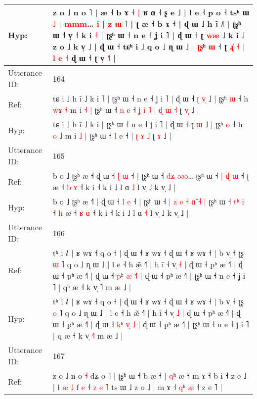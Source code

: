 \documentclass[10pt]{article}
\DeclareRobustCommand{\hl}[1]{{\textcolor{red}{#1}}}
\begin{document}
\begin{longtable}{ll}
 \\
Hyp: & z o ˩ n o ˥ |\hl{}\hl{} æ ˧ b ɤ ˧\hl{ }\hl{|} ʁ ɑ ˧ ʂ e ˩ | l e ˧ p o ˧ tsʰ ɯ \hl{}\hl{˩} |\hl{}\hl{}\hl{}\hl{}\hl{}\hl{} \hl{m}\hl{m}\hl{m}…\hl{}\hl{} \hl{i} \hl{|} \hl{z} \hl{ɯ} ˥ | ʈ æ ˧ b ɤ ˧ | ɖ ɯ ˩ h ĩ ˩˥ | ʈʂʰ ɯ ˧ v̩ ˧ k i \hl{˧} | ʈʂʰ ɯ ˧ n e ˧ ʝ i ˥ | ɖ ɯ ˧ ʈ \hl{w}\hl{æ} ˩ k i ˩ z o ˩ k v̩ ˩ | ɖ ɯ ˧ tɕʰ i ˩ q o ˩ ɳ ɯ ˩ | \hl{ʈ}\hl{ʂ}ʰ \hl{}\hl{ɯ} ˧ ʈ \hl{ɻ}\hl{̍} \hl{˧} \hl{|} \hl{l} \hl{e} \hl{˧} ɖ ɯ ˧ ʈ v̩ \hl{˧}\hl{˥} |
 \\
\midrule
Utterance ID: & 164 \\
Ref: & tɕ i ˩ h ĩ ˩ k i\hl{ }\hl{˥} | ʈʂʰ ɯ ˧ n e ˧ ʝ i ˥ | ɖ ɯ ˧ ʈ \hl{v}\hl{̩} ˩ | ʈʂʰ \hl{ɯ} ˧ h \hl{w}\hl{ɤ} \hl{˧} m i \hl{˧} | ʈʂʰ ɯ ˧ \hl{n} e ˧\hl{ }\hl{ʝ}\hl{ }\hl{i}\hl{ }\hl{˥} | \hl{ɖ} \hl{ɯ} \hl{˧} ʈ \hl{v}\hl{̩} ˩ |
 \\
Hyp: & tɕ i ˩ h ĩ ˩ k i\hl{}\hl{} | ʈʂʰ ɯ ˧ n e ˧ ʝ i ˥ | ɖ ɯ ˧ ʈ \hl{}\hl{ɯ} ˩ | ʈʂʰ \hl{o} ˧ h \hl{}\hl{o} \hl{˩} m i \hl{˩} | ʈʂʰ ɯ ˧ \hl{l} e ˧\hl{}\hl{}\hl{}\hl{}\hl{}\hl{} | \hl{ʈ} \hl{ɤ} \hl{˩} ʈ \hl{}\hl{ɤ} ˩ |
 \\
\midrule
Utterance ID: & 165 \\
Ref: & b o ˩ ʈʂʰ æ ˧\hl{}\hl{}\hl{} ɖ ɯ ˧ \hl{ɭ} \hl{ɯ} ˧ | ʈʂʰ ɯ ˧\hl{}\hl{}\hl{}\hl{} \hl{}\hl{d}\hl{ʑ} \hl{}\hl{}\hl{ə}\hl{ə}\hl{ə}\hl{…} ʈʂʰ ɯ ˧ \hl{|}\hl{ }\hl{ɖ} \hl{ɯ} ˧ \hl{ʈ} æ ˧ \hl{b} \hl{ɤ} ˧ k i ˧ k i ˩ l ɑ \hl{˩} l v̩ ˩ k v̩ ˩ |
 \\
Hyp: & b o ˩ ʈʂʰ æ ˧\hl{˥}\hl{ }\hl{|} ɖ ɯ ˧ \hl{l} \hl{e} ˧ | ʈʂʰ ɯ ˧\hl{ }\hl{|}\hl{ }\hl{z} \hl{e}\hl{ }\hl{˧} \hl{ɑ}\hl{̃}\hl{ }\hl{˧}\hl{ }\hl{|} ʈʂʰ ɯ ˧ \hl{}\hl{t}\hl{ʰ} \hl{i} ˧ \hl{h} æ ˧ \hl{ʁ} \hl{ɑ} ˧ k i ˧ k i ˩ l ɑ \hl{˧} l v̩ ˩ k v̩ ˩ |
 \\
\midrule
Utterance ID: & 166 \\
Ref: & tʰ i ˩˥ | ʁ wɤ ˧ q o ˧ | ɖ ɯ ˧ ʁ wɤ ˧ ɖ ɯ ˧ ʁ wɤ ˧ | b v̩ ˧ ʈʂ \hl{ɯ} ˥ q o ˩ ɳ ɯ ˩ | l e ˧ h æ̃ ˧˥ | h ĩ ˧ v̩ \hl{˧} | ɖ ɯ ˧ pʰ æ ˧˥ | ɖ ɯ ˧ pʰ æ ˧˥ | ɖ ɯ ˧ \hl{p}ʰ \hl{æ}\hl{ }\hl{˧}\hl{˥} | ɖ ɯ ˧ pʰ æ ˧˥ | ʈʂʰ ɯ ˧ n e ˧ ʝ i ˥ | q\hl{ʰ} æ ˧ k v̩ \hl{}˥ m æ ˩ |
 \\
Hyp: & tʰ i ˩˥ | ʁ wɤ ˧ q o ˧ | ɖ ɯ ˧ ʁ wɤ ˧ ɖ ɯ ˧ ʁ wɤ ˧ | b v̩ ˧ ʈʂ \hl{o} ˥ q o ˩ ɳ ɯ ˩ | l e ˧ h æ̃ ˧˥ | h ĩ ˧ v̩ \hl{˩} | ɖ ɯ ˧ pʰ æ ˧˥ | ɖ ɯ ˧ pʰ æ ˧˥ | ɖ ɯ ˧ \hl{k}ʰ \hl{v}\hl{̩}\hl{ }\hl{˩} | ɖ ɯ ˧ pʰ æ ˧˥ | ʈʂʰ ɯ ˧ n e ˧ ʝ i ˥ | q\hl{} æ ˧ k v̩ \hl{˧}˥ m æ ˩ |
 \\
\midrule
Utterance ID: & 167 \\
Ref: & z o ˩ n o \hl{˧} dʑ o ˥ | ʈʂʰ ɯ ˧ b æ ˧ | \hl{q}ʰ æ ˧ m ɤ ˧ b i ˧ z e ˩ | l \hl{æ} \hl{˩} f \hl{}\hl{e} ˧ \hl{z} \hl{e} \hl{˥} ts ɯ ˩\hl{}\hl{} z o ˩ | m ɤ ˧ \hl{q}ʰ \hl{}\hl{æ} ˧ z e ˥ |

\end{longtable}
\end{document}

